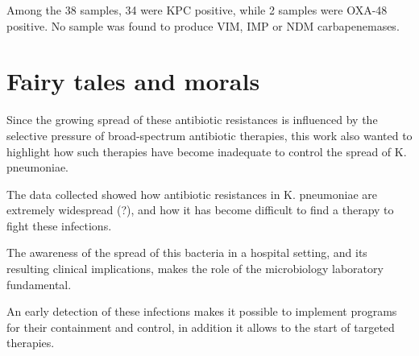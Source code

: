 \documentclass[11pt]{report}
\begin{document}
Among the 38 samples, 34 were KPC positive, while 2 samples were OXA-48 positive.
No sample was found to produce VIM, IMP or NDM carbapenemases.


\chapter{Fairy tales and morals}
Since the growing spread of these antibiotic resistances is influenced by the selective pressure of broad-spectrum antibiotic therapies, this work also wanted to highlight how such therapies have become inadequate to control the spread of K. pneumoniae.


The data collected showed how antibiotic resistances in K. pneumoniae are extremely widespread (?), and how it has become difficult to find a therapy to fight these infections.

The awareness of the spread of this bacteria in a hospital setting, and its resulting clinical implications, makes the role of the microbiology laboratory fundamental. 

An early detection of these infections makes it possible to implement programs for their containment and control, in addition it allows to the start of targeted therapies.
































\end{document}
